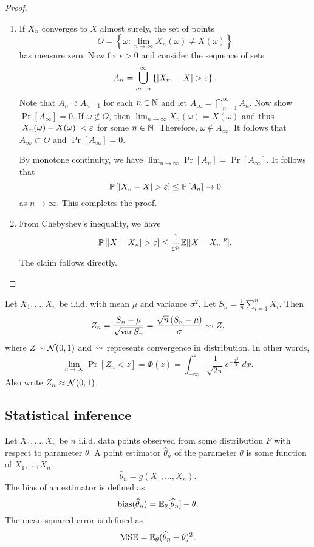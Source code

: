 \documentclass[a4paper]{article}
\begin{document}
\begin{proof}

\begin{enumerate}
  \item If $X_n$ converges to $X$ almost surely,
  the set of points 
  \[
  O = \left\{ \omega : \lim_{n \to \infty}
  X_n(\omega) \neq X(\omega) \right\}
  \]
  has measure zero.
  Now fix $\epsilon > 0$ and consider the sequence of
  sets
  \[
  A_n = \bigcup_{m = n}^\infty \left\{ \left\lvert X_m - X\right\rvert > \varepsilon \right\}.
  \]
  Note that $A_n \supset A_{n+1}$ for each $n \in \mathbb{N}$ and
  let $A_\infty = \bigcap_{n=1}^\infty A_n$.
  Now show $\Pr[A_\infty] = 0$. If $\omega \notin O$, then
  $\lim_{n \to \infty} X_n (\omega) = X(\omega)$ and thus
  $\left\lvert X_n(\omega) - X(\omega)\right\rvert < \varepsilon$ for some $n \in \mathbb{N}$.
  Therefore, $\omega \notin A_\infty$.
  It follows that $A_\infty \subset O$ and $\Pr[A_\infty] = 0$.

  By monotone
  continuity, we have $\lim_{n \to \infty} \Pr[A_n] =
  \Pr[A_\infty]$. It follows that
  \[
  \mathbb{P} \left[ \left\lvert X_n - X\right\rvert > \varepsilon \right]
  \leq \mathbb{P} \left[ A_n \right] \to 0
  \]
  as $n \to \infty$. This completes the proof.

  \item From Chebyshev's inequality, we have
  \[
  \mathbb{P} \left[ \left\lvert X - X_n\right\rvert > \varepsilon \right] \leq
  \frac{1}{\varepsilon^p} \mathbb{E} [\left\lvert X - X_n\right\rvert^p].
  \]
  The claim follows directly.
\end{enumerate}

\end{proof}

\begin{thm}
  Let $X_1, \dots, X_n$ be i.i.d. with mean $\mu$ and variance
  $\sigma^2$. Let $S_n = \frac{1}{n} \sum_{i=1}^n X_i$.
  Then
  \[
  Z_n = \frac{S_n - \mu}{\sqrt{\operatorname{var} S_n}}
  = \frac{\sqrt{n} \left( S_n - \mu \right)}{\sigma}
  \rightsquigarrow Z,
  \]
  where $Z \sim \mathcal{N}(0, 1)$ and $\rightsquigarrow$ represents 
  convergence in distribution. In other words,
  \[
  \lim_{n \to \infty} \Pr[Z_n < z] = \Phi(z)
  = \int_{-\infty}^z \frac{1}{\sqrt{2\pi}} e^{- \frac{x^2}{2}}
  \; dx.
  \]
  Also write $Z_n \approx \mathcal{N}(0, 1)$.
\end{thm}

\subsection{Statistical inference}

\begin{defi}
  Let $X_1, \dots, X_n$ be $n$ i.i.d. data points observed
  from some distribution $F$ with respect to parameter
  $\theta$. A point estimator $\hat{\theta}_n$
  of the parameter $\theta$ is some function of
  $X_1, \dots, X_n$:
  \[
  \hat{\theta}_n = g(X_1, \dots, X_n).
  \]
  The bias of an estimator is defined as
  \[
  \operatorname{bias} (\widehat{\theta}_n)
  = \mathbb{E}_\theta [\widehat{\theta}_n] - \theta.
  \]
  The mean squared error is defined as
  \[
  \operatorname{MSE} = \mathbb{E}_\theta (\widehat{\theta}_n - \theta)^2.
  \]
\end{defi}
\end{document}

